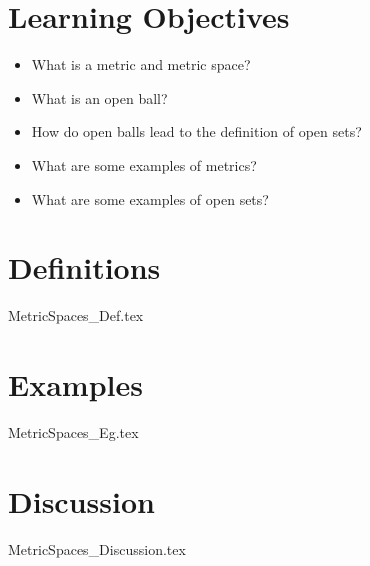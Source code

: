 \section{Learning Objectives}
\begin{itemize}
    \item What is a metric and metric space?
    \item What is an open ball?
    \item How do open balls lead to the definition of open sets?
    \item What are some examples of metrics?
    \item What are some examples of open sets?
\end{itemize}


\section{Definitions}

{MetricSpaces_Def.tex}

\section{Examples}

{MetricSpaces_Eg.tex}

\section{Discussion}

{MetricSpaces_Discussion.tex}